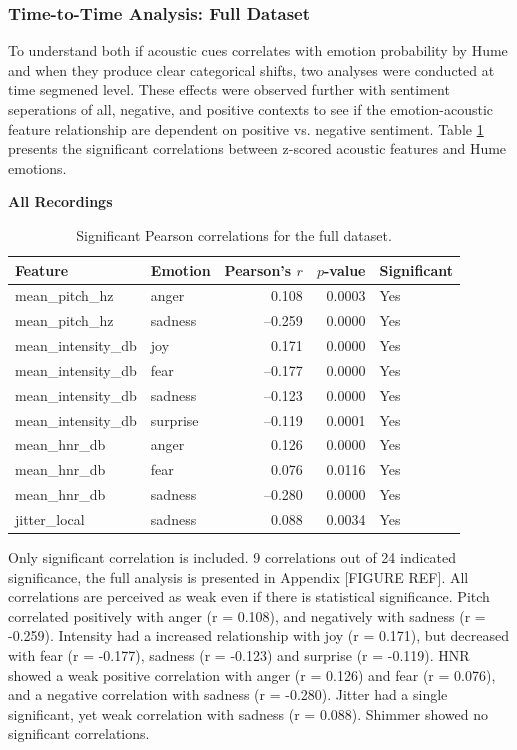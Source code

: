 \subsubsection{Time-to-Time Analysis: Full Dataset}
To understand both if acoustic cues correlates with emotion probability by Hume and when they produce clear categorical shifts, two analyses were conducted at time segmened level. 
These effects were observed further with sentiment seperations of all, negative, and positive contexts to see if the emotion-acoustic feature relationship are dependent on positive vs. negative sentiment. 
Table \ref{tab:rq1_time_all_correlations} presents the significant correlations between z-scored acoustic features and Hume emotions.
\begin{table}[H]
    \centering
    \caption*{\textbf{All Recordings}}
    \begin{tabular}{l l r r l}
      \toprule
      \textbf{Feature} & \textbf{Emotion} & \textbf{Pearson’s \(r\)} & \textbf{\(p\)-value} & \textbf{Significant} \\
      \midrule
      mean\_pitch\_hz       & anger      &  0.108  & 0.0003 & Yes \\
      mean\_pitch\_hz       & sadness    & –0.259  & 0.0000 & Yes \\
      mean\_intensity\_db   & joy        &  0.171  & 0.0000 & Yes \\
      mean\_intensity\_db   & fear       & –0.177  & 0.0000 & Yes \\
      mean\_intensity\_db   & sadness    & –0.123  & 0.0000 & Yes \\
      mean\_intensity\_db   & surprise   & –0.119  & 0.0001 & Yes \\
      mean\_hnr\_db         & anger      &  0.126  & 0.0000 & Yes \\
      mean\_hnr\_db         & fear       &  0.076  & 0.0116 & Yes \\
      mean\_hnr\_db         & sadness    & –0.280  & 0.0000 & Yes \\
      jitter\_local         & sadness    &  0.088  & 0.0034 & Yes \\
      \bottomrule
    \end{tabular}
    \caption{Significant Pearson correlations for the full dataset.}
    \label{tab:rq1_time_all_correlations}
  \end{table}
 
  Only significant correlation is included. 9 correlations out of 24 indicated significance, the full analysis is presented in Appendix [FIGURE REF]. 
  All correlations are perceived as weak even if there is statistical significance. Pitch correlated positively with anger (r = 0.108), and negatively with sadness (r = -0.259). 
  Intensity had a increased relationship with joy (r = 0.171), but decreased with fear (r = -0.177), sadness (r = -0.123) and surprise (r = -0.119). HNR showed a weak positive correlation with anger (r = 0.126) and fear (r = 0.076), and a negative correlation with sadness (r = -0.280). 
  Jitter had a single significant, yet weak correlation with sadness (r = 0.088). Shimmer showed no significant correlations. 

